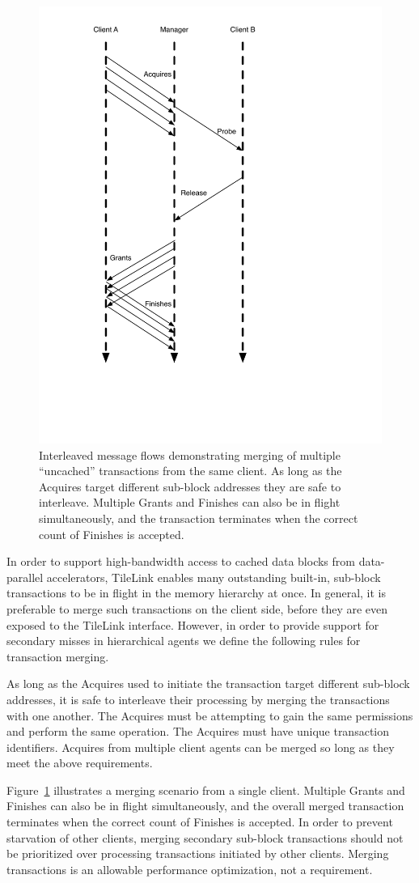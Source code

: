 \begin{figure}[p]
\centering
\includegraphics[width=0.5\columnwidth]{tilelink/figures/acq-merge.pdf}
\caption{Interleaved message flows demonstrating merging of multiple ``uncached'' transactions from the same client.
As long as the Acquires target different sub-block addresses they are safe to interleave.
Multiple Grants and Finishes can also be in flight simultaneously, and the transaction terminates when the correct count of Finishes is accepted.}
\label{fig:acq-merge}
\end{figure}

In order to support high-bandwidth access to cached data blocks from data-parallel accelerators, TileLink enables many outstanding built-in, sub-block transactions
to be in flight in the memory hierarchy at once.
In general, it is preferable to merge such transactions on the client side, before they are even exposed to the TileLink interface.
However, in order to provide support for secondary misses in hierarchical agents we define the following rules for transaction merging.

As long as the Acquires used to initiate the transaction target different sub-block addresses, it is safe to interleave their processing by merging the transactions with one another.
The Acquires must be attempting to gain the same permissions and perform the same operation.
The Acquires must have unique transaction identifiers.
Acquires from multiple client agents can be merged so long as they meet the above requirements.

Figure~\ref{fig:acq-merge} illustrates a merging scenario from a single client.
Multiple Grants and Finishes can also be in flight simultaneously, and the overall merged transaction terminates when the correct count of Finishes is accepted.
In order to prevent starvation of other clients, merging secondary sub-block transactions should not be prioritized over processing transactions initiated by other clients.
Merging transactions is an allowable performance optimization, not a requirement.

